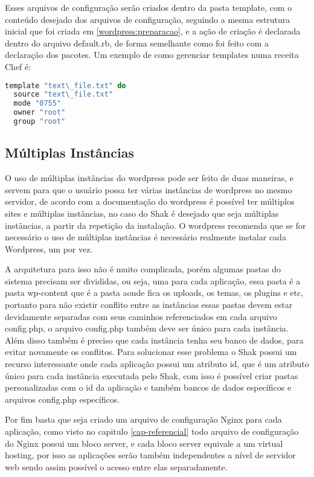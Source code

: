 Esses arquivos de configuração serão criados dentro da pasta template, com o conteúdo
desejado dos arquivos de configuração, seguindo a mesma estrutura
inicial que foi criada em \ref{wordpress:preparacao}, e a ação de criação é
declarada dentro do arquivo default.rb, de forma semelhante como foi feito com
a declaração dos pacotes. Um exemplo de como gerenciar templates numa receita Chef
é:

\begin{lstlisting}[language=Ruby,label=dice_index,caption={Exemplo de criação de templates com o chef}]
  template "text\_file.txt" do
  source "text\_file.txt"
  mode "0755"
  owner "root"
  group "root"
\end{lstlisting}

\subsection{Múltiplas Instâncias}

O uso de múltiplas instâncias do wordpress pode ser feito de duas maneiras, e servem
para que o usuário possa ter várias instâncias de wordpress no mesmo servidor, de
acordo com a documentação do wordpress é possível ter múltiplos sites e múltiplas
instâncias, no caso do Shak é desejado que seja múltiplas instâncias, a partir da
repetição da instalação. O wordpress recomenda que se for necessário o uso de múltiplas
instâncias é necessário realmente instalar cada Wordpress, um por vez.

A arquitetura para isso não é muito complicada, porém algumas pastas do sistema
precisam ser divididas, ou seja, uma para cada aplicação, essa pasta é a pasta wp-content
que é a pasta aonde fica os uploads, os temas, os plugins e etc, portanto para não
existir conflito entre as instâncias essas pastas devem estar devidamente separadas
com seus caminhos referenciados em cada arquivo config.php, o arquivo config.php também
deve ser único para cada instância. Além disso também é preciso que cada instância
tenha seu banco de dados, para evitar novamente os conflitos. Para
solucionar esse problema o Shak possui um recurso interessante onde cada aplicação
possui um atributo id, que é um atributo único para cada instância executada pelo
Shak, com isso é possível criar pastas personalizadas com o id da aplicação e também
bancos de dados específicos e arquivos config.php específicos.

Por fim basta que seja criado um arquivo de configuração Nginx para cada aplicação,
como visto no capitulo \ref{cap-referencial} todo arquivo de configuração
do Nginx possui um bloco server, e cada bloco server equivale a um virtual hosting,
por isso as aplicações serão também independentes a nível de servidor web sendo assim
possível o acesso entre elas separadamente.

